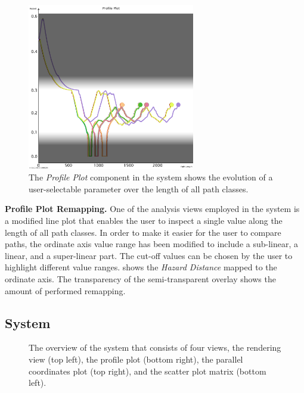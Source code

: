 \begin{figure}
\centering
\includegraphics[width=0.65\textwidth]{figures/contributions/usar/profile_plot.png}
\caption{The \emph{Profile Plot} component in the system shows the evolution of a user-selectable parameter over the length of all path classes.}
\label{contributions:usar:rendering:profile}
\end{figure}

\textbf{Profile Plot Remapping.}  One of the analysis views employed in the system is a modified line plot that enables the user to inspect a single value along the length of all path classes.  In order to make it easier for the user to compare paths, the ordinate axis value range has been modified to include a sub-linear, a linear, and a super-linear part.  The cut-off values can be chosen by the user to highlight different value ranges.   shows the \emph{Hazard Distance} mapped to the ordinate axis.  The transparency of the semi-transparent overlay shows the amount of performed remapping.

\subsection{System} \label{contributions:usar:system}
\begin{figure}
\centering
{}
\caption{The overview of the system that consists of four views, the rendering view (top left), the profile plot (bottom right), the parallel coordinates plot (top right), and the scatter plot matrix (bottom left).}
\label{contributions:usar:system:system}
\end{figure}

